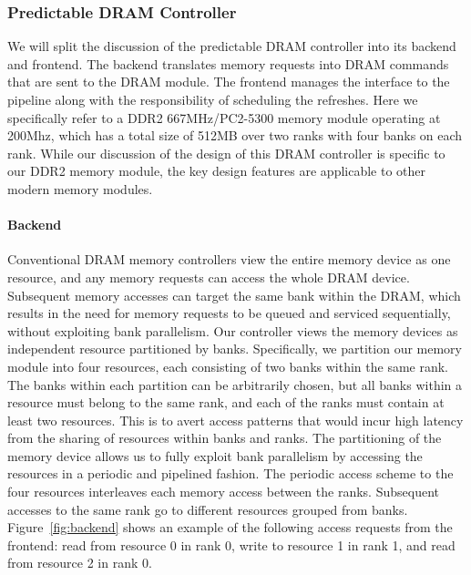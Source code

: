 \subsubsection{Predictable DRAM Controller}
\label{sec:pret_dram_controller}
We will split the discussion of the predictable DRAM controller into its backend and frontend. 
The backend translates memory requests into DRAM commands that are sent to the DRAM module.
The frontend manages the interface to the pipeline along with the responsibility of scheduling the refreshes.
Here we specifically refer to a DDR2 667MHz/PC2-5300 memory module operating at 200Mhz, which has a total size of 512MB over two ranks with four banks on each rank.
While our discussion of the design of this DRAM controller is specific to our DDR2 memory module, the key design features are applicable to other modern memory modules.

\paragraph{Backend}
Conventional DRAM memory controllers view the entire memory device as one resource, and any memory requests can access the whole DRAM device. 
Subsequent memory accesses can target the same bank within the DRAM, which results in the need for memory requests to be queued and serviced sequentially, without exploiting bank parallelism.
Our controller views the memory devices as independent resource partitioned by banks. 
Specifically, we partition our memory module into four resources, each consisting of two banks within the same rank. 
The banks within each partition can be arbitrarily chosen, but all banks within a resource must belong to the same rank, and each of the ranks must contain at least two resources.
This is to avert access patterns that would incur high latency from the sharing of resources within banks and ranks.
The partitioning of the memory device allows us to fully exploit bank parallelism by accessing the resources in a periodic and pipelined fashion.
The periodic access scheme to the four resources interleaves each memory access between the ranks.
Subsequent accesses to the same rank go to different resources grouped from banks.  
Figure~\ref{fig:backend} shows an example of the following access requests from the frontend: read from resource 0 in rank 0, write to resource 1 in rank 1, and read from resource 2 in rank 0. 

